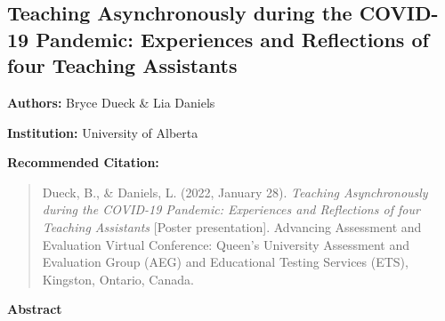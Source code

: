 \documentclass[
]{book}
\begin{document}
\newpage

\hypertarget{teaching-asynchronously-during-the-covid-19-pandemic-experiences-and-reflections-of-four-teaching-assistants}{%
\subsection{Teaching Asynchronously during the COVID-19 Pandemic: Experiences and Reflections of four Teaching Assistants}\label{teaching-asynchronously-during-the-covid-19-pandemic-experiences-and-reflections-of-four-teaching-assistants}}

\textbf{Authors:} Bryce Dueck \& Lia Daniels

\textbf{Institution:} University of Alberta

\textbf{Recommended Citation:}

\begin{quote}
Dueck, B., \& Daniels, L. (2022, January 28). \emph{Teaching Asynchronously during the COVID-19 Pandemic: Experiences and Reflections of four Teaching Assistants} {[}Poster presentation{]}. Advancing Assessment and Evaluation Virtual Conference: Queen's University Assessment and Evaluation Group (AEG) and Educational Testing Services (ETS), Kingston, Ontario, Canada.
\end{quote}

\textbf{Abstract}
\end{document}
